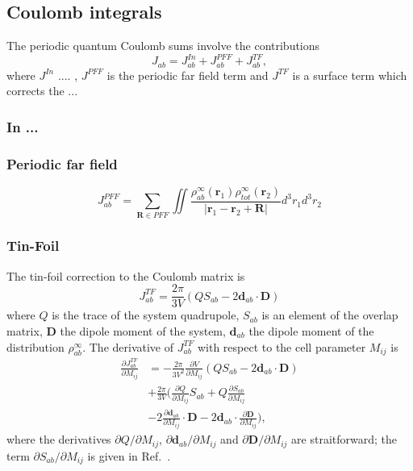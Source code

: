 \documentclass[prl,twocolumn,showpacs,twocolumngrid,superbib]{revtex4}
\begin{document}
\subsection{Coulomb integrals}
The periodic quantum Coulomb sums involve the contributions
\begin{equation}
  J_{ab}=J_{ab}^{In}+J_{ab}^{PFF}+J_{ab}^{TF},
\end{equation}
where $J^{In}$ .... , $J^{PFF}$ is the periodic far field term and $J^{TF}$ 
is a surface term which corrects the ...

\subsubsection{In ...}


\subsubsection{Periodic far field}

\begin{equation}
  J_{ab}^{PFF}=\sum_{\mathbf{R}\in PFF}\iint
  \frac{\rho_{ab}^{\infty}(\mathbf{r}_1)\rho_{tot}^{\infty}(\mathbf{r}_2)}{|\mathbf{r}_1-\mathbf{r}_2+\mathbf{R}|}
  d^3r_1d^3r_2
\end{equation}

\subsubsection{Tin-Foil}
The tin-foil correction to the Coulomb matrix is
\begin{equation}
  J_{ab}^{TF}=\frac{2\pi}{3V}(QS_{ab}-2\mathbf{d}_{ab}\cdot\mathbf{D})
\end{equation}
where $Q$ is the trace of the system quadrupole, $S_{ab}$ is an element of the overlap matrix,
$\mathbf{D}$ the dipole moment of the system,
$\mathbf{d}_{ab}$ the dipole moment of the distribution $\rho_{ab}^\infty$.
The derivative of $J_{ab}^{TF}$ with respect to the cell parameter $M_{ij}$ is
\begin{equation}
  \begin{split}
    \frac{\partial J_{ab}^{TF}}{\partial M_{ij}}&=
    -\frac{2\pi}{3V^2}\frac{\partial V}{\partial M_{ij}}(QS_{ab}-2\mathbf{d}_{ab}\cdot\mathbf{D})\\
    &+\frac{2\pi}{3V}\bigg(\frac{\partial Q}{\partial M_{ij}}S_{ab}+Q\frac{\partial S_{ab}}{\partial M_{ij}}\\
    &-2\frac{\partial \mathbf{d}_{ab}}{\partial M_{ij}}\cdot\mathbf{D}
    -2\mathbf{d}_{ab}\cdot\frac{\partial \mathbf{D}}{\partial M_{ij}} \bigg),
  \end{split}
\end{equation}
where the derivatives ${\partial Q}/{\partial M_{ij}}$,
${\partial \mathbf{d}_{ab}}/{\partial M_{ij}}$ and
${\partial \mathbf{D}}/{\partial M_{ij}}$ are straitforward;
the term ${\partial S_{ab}}/{\partial M_{ij}}$
is given in Ref.~\cite{KDoll04}.
\end{document}
